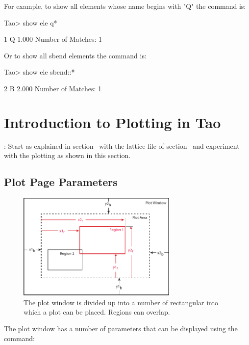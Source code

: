 \documentclass{hitec}
\newcommand{\Section}[1]{\section{#1}\vspace*{-1ex}}
\begin{document}
For example, to show all elements whose name begins with "Q" the command is:
{\small
\begin{code}
Tao> show ele q*

         1  Q                                                1.000
Number of Matches: 1
\end{code}}

Or to show all sbend elements the command is:
{\small
\begin{code}  
Tao> show ele sbend::*

         2  B                                                2.000
Number of Matches: 1
\end{code}}

\Section{Introduction to Plotting in Tao}

: Start \tao as explained in section~ with the lattice file
 of section~ and experiment with the plotting as shown 
in this section.

\subsection{Plot Page Parameters}

\begin{figure}[tb]
  \centering
  \includegraphics[width=0.7\textwidth]{plot-page.pdf}
  \caption{The plot window is divided up into a number of rectangular  into
which a plot  can be placed. Regions can overlap.}
  \label{f:plot.regions}
\end{figure}

The plot window has a number of parameters that can be displayed using the 
command:
\end{document}
